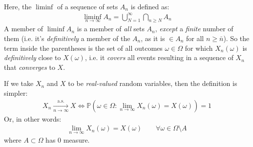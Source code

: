 \documentclass[../template.tex]{subfiles}
\begin{document}
\begin{enumerate}
\begin{align*}
    \end{align*}
    Here, the $\liminf$ of a sequence of sets $A_n$ is defined as:
    \begin{align*}
        \liminf_{n \to\infty } A_n = \bigcup_{N = 1}^{\infty} \bigcap_{n \geq N} A_n
    \end{align*}
    A member of $\liminf A_n$ is a member of \textit{all} sets $A_n$, \textit{except} a \textit{finite} number of them (i.e. it's \textit{definitively} a member of the $A_n$, as it is $\in A_n$ for all $n \geq \bar{n}$). So the term inside the parentheses is the set of all outcomes $\omega \in \Omega$ for which $X_n(\omega)$ is \textit{definitively} close to $X(\omega)$, i.e. it \textit{covers} all events resulting in a sequence of $X_n$ that \textit{converges} to $X$. 

    If we take $X_n$ and $X$ to be \textit{real-valued} random variables, then the definition is simpler:
    \begin{align*}
        X_n  \xrightarrow[n \to \infty]{\mathrm{a.s.}} X \Leftrightarrow \mathbb{P} \left(\omega \in \Omega \colon \lim_{n \to \infty} X_n(\omega) = X(\omega)\right) = 1
    \end{align*} 
    Or, in other words:
    \begin{align*}
        \lim_{n \to\infty } X_n(\omega) = X(\omega) \qquad \forall \omega \in \Omega \setminus A
    \end{align*}
    where $A \subset \Omega$ has $0$ measure.  
\end{enumerate}
\end{document}

